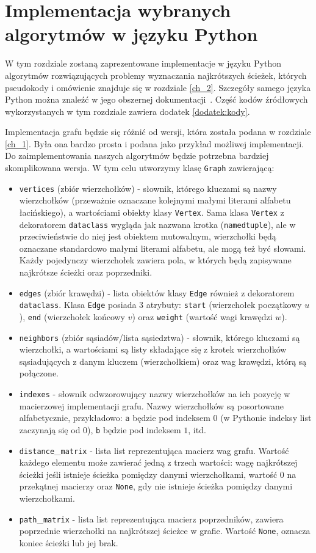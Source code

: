 \documentclass[12pt,a4paper]{book}
\theoremstyle{definition}
\numberwithin{equation}{chapter}
\begin{document}
\chapter{Implementacja wybranych algorytmów w języku Python}\label{ch_3}

W tym rozdziale zostaną zaprezentowane implementacje w języku Python algorytmów rozwiązujących problemy wyznaczania najkrótszych ścieżek, których pseudokody i omówienie znajduje się w rozdziale \ref{ch_2}. Szczegóły samego języka Python można znaleźć w jego obszernej dokumentacji~\cite{python_docs}. Część kodów źródłowych wykorzystanych w tym rozdziale zawiera dodatek \ref{dodatek:kody}.

Implementacja grafu będzie się różnić od wersji, która została podana w  rozdziale \ref{ch_1}. Była ona bardzo prosta i podana jako przykład możliwej implementacji. Do zaimplementowania naszych algorytmów będzie potrzebna bardziej skomplikowana wersja. W tym celu utworzymy klasę \texttt{Graph} zawierającą:
\begin{itemize}
\item \texttt{vertices} (zbiór wierzchołków) - słownik, którego kluczami są nazwy wierzchołków (przeważnie oznaczane kolejnymi małymi literami alfabetu łacińskiego), a wartościami obiekty klasy \texttt{Vertex}. Sama klasa \texttt{Vertex} z dekoratorem \texttt{dataclass} wygląda jak nazwana krotka (\texttt{namedtuple}), ale w przeciwieństwie do niej jest obiektem mutowalnym, wierzchołki będą oznaczane standardowo małymi literami alfabetu, ale mogą też być słowami. Każdy pojedynczy wierzchołek zawiera pola, w których będą zapisywane najkrótsze ścieżki oraz poprzedniki.
\item \texttt{edges} (zbiór krawędzi) - lista obiektów klasy \texttt{Edge} również z dekoratorem \texttt{dataclass}. Klasa \texttt{Edge} posiada $3$ atrybuty: \texttt{start} (wierzchołek początkowy $u$), \texttt{end} (wierzchołek końcowy $v$) oraz \texttt{weight} (wartość wagi krawędzi $w$).
\item \texttt{neighbors} (zbiór sąsiadów/lista sąsiedztwa) - słownik, którego kluczami są wierzchołki, a wartościami są listy składające się z krotek wierzchołków sąsiadujących z danym kluczem (wierzchołkiem) oraz wag krawędzi, którą są połączone.
\item \texttt{indexes} - słownik odwzorowujący nazwy wierzchołków na ich pozycję w macierzowej implementacji grafu. Nazwy wierzchołków są posortowane alfabetycznie, przykładowo: \texttt{a} będzie pod indeksem $0$ (w Pythonie indeksy list zaczynają się od $0$), \texttt{b} będzie pod indeksem $1$, itd.
\item \texttt{distance}\_\texttt{matrix} - lista list reprezentująca macierz wag grafu. Wartość każdego elementu może zawierać jedną z trzech wartości: wagę najkrótszej ścieżki jeśli istnieje ścieżka pomiędzy danymi wierzchołkami, wartość $0$ na przekątnej macierzy  oraz \texttt{None}, gdy nie istnieje ścieżka pomiędzy danymi wierzchołkami.
\item \texttt{path}\_\texttt{matrix} - lista list reprezentująca macierz poprzedników, zawiera poprzednie wierzchołki na najkrótszej ścieżce w grafie. Wartość \texttt{None}, oznacza koniec ścieżki lub jej brak.
\end{itemize}
\end{document}
